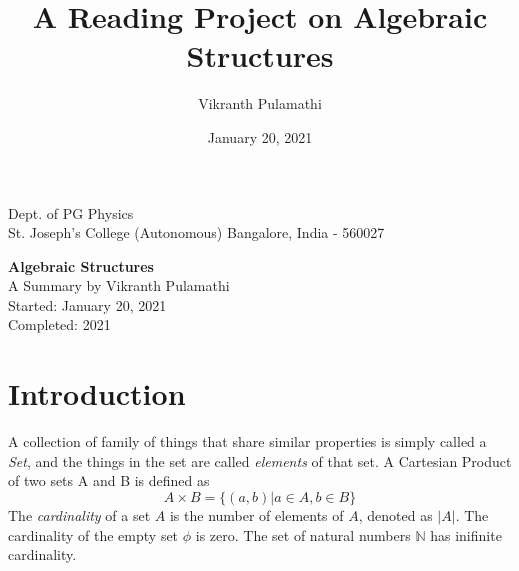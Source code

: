 \documentclass[a4paper, 12pt]{article}
\title{\textbf{A Reading Project on Algebraic Structures}}
\author{Vikranth Pulamathi}
\date{January 20, 2021}
\numberwithin{equation}{section}
\begin{document}
\maketitle
\vspace{13cm}
\begin{center}
Dept. of PG Physics\\
St. Joseph's College (Autonomous)
Bangalore, India - 560027
\end{center}


\thispagestyle{empty}
\cleardoublepage

\tableofcontents
\thispagestyle{empty}
\cleardoublepage

\newpage
{}
\begin{center} 
 {\huge \textbf{Algebraic Structures}}\\
 \vspace{1mm}
A Summary by Vikranth Pulamathi\\
\hfill Started: January 20, 2021\\
\hfill Completed: 2021
\end{center}

\section{Introduction}
A collection of family of things that share similar properties is simply called a \textit{Set}, and the things in the set are called \textit{elements} of that set. A Cartesian Product of two sets A and B is defined as
\begin{equation}
A \times B = \{ (a, b) | a \in A, b \in B \}
\end{equation}
The \textit{cardinality} of a set $A$ is the number of elements of $A$, denoted as $|A|$. The cardinality of the empty set $\phi$ is zero. The set of natural numbers $\mathbb{N}$ has inifinite cardinality.
\end{document}
